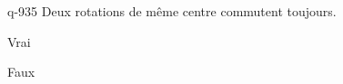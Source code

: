 \begin{truefalse}{q-935}
Deux rotations de même centre commutent toujours.
\item* Vrai
\item Faux
\end{truefalse}

